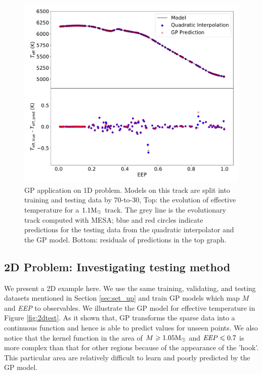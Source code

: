 \begin{figure}
	\includegraphics[width=1.0\columnwidth]{1d-gp.pdf}
    \caption{GP application on 1D problem. Models on this track are split into training and testing data by 70-to-30, Top: the evolution of effective temperature for a $\rm 1.1M_{\odot}$ track. The grey line is the evolutionary track computed with \textsc{MESA}; blue and red circles indicate predictions for the testing data from the quadratic interpolator and the GP model. Bottom: residuals of predictions in the top graph. }  
    \label{fig:1dgp}
\end{figure}

\subsection{2D Problem: Investigating testing method}

We present a 2D example here.  We use the same training, validating, and testing datasets mentioned in Section \ref{sec:set_up} and train GP models which map $M$ and {\it EEP} to observables. We illustrate the GP model for effective temperature in Figure \ref{fig:2dtest}. As it shown that, GP transforms the sparse data into a continuous function and hence is able to predict values for unseen points.
%
We also notice that the kernel function in the area of $M \geq 1.05 {\rm M_{\odot}}$ and ${\it EEP} \leq 0.7$ is more complex than that for other regions because of the appearance of the 'hook'. This particular area are relatively difficult to learn and poorly predicted by the GP model. 

